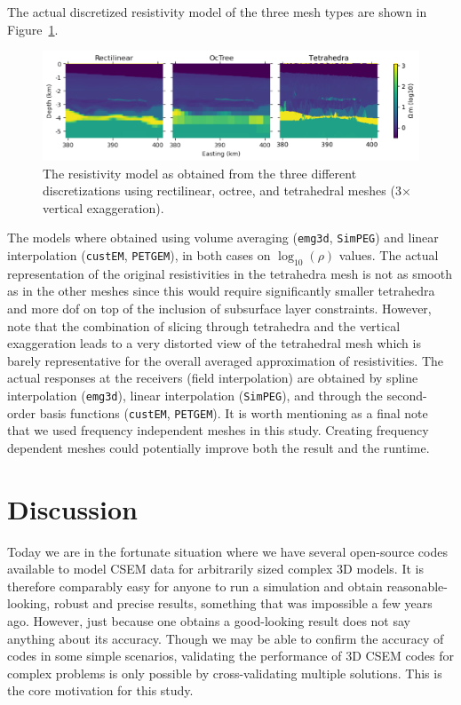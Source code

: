 \documentclass[onecolumn,extra,camera]{gji}
\newcommand{\emg}[2]{\texttt{emg#1#2}\xspace}
\newcommand{\simpeg}{\texttt{SimPEG}\xspace}
\newcommand{\custem}{\texttt{custEM}\xspace}
\newcommand{\petgem}{\texttt{PETGEM}\xspace}
\begin{document}
The actual discretized resistivity model of the three mesh types are shown in Figure~\ref{fig:results-marlim_allmodels}.
%
\begin{figure}
  \centering
  \includegraphics[width=.9\linewidth]{figures/results-marlim_allmodels}
  \caption{The resistivity model as obtained from the three different discretizations using rectilinear, octree, and tetrahedral meshes (3$\times$ vertical exaggeration).}
  \label{fig:results-marlim_allmodels}
\end{figure}
%
The models where obtained using volume averaging (\emg3d, \simpeg) and linear interpolation (\custem, \petgem), in both cases on $\log_{10}(\rho)$ values. The actual representation of the original resistivities in the tetrahedra mesh is not as smooth as in the other meshes since this would require significantly smaller tetrahedra and more dof on top of the inclusion of subsurface layer constraints. However, note that the combination of slicing through tetrahedra and the vertical exaggeration leads to a very distorted view of the tetrahedral mesh which is barely representative for the overall averaged approximation of resistivities. The actual responses at the receivers (field interpolation) are obtained by spline interpolation (\emg3d), linear interpolation (\simpeg), and through the second-order basis functions (\custem, \petgem). It is worth mentioning as a final note that we used frequency independent meshes in this study. Creating frequency dependent meshes could potentially improve both the result and the runtime.

\section{Discussion}

Today we are in the fortunate situation where we have several open-source codes available to model CSEM data for arbitrarily sized complex 3D models. It is therefore comparably easy for anyone to run a simulation and obtain reasonable-looking, robust and precise results, something that was impossible a few years ago. However, just because one obtains a good-looking result does not say anything about its accuracy. Though we may be able to confirm the accuracy of codes in some simple scenarios, validating the performance of 3D CSEM codes for complex problems is only possible by cross-validating multiple solutions. This is the core motivation for this study.
\end{document}
